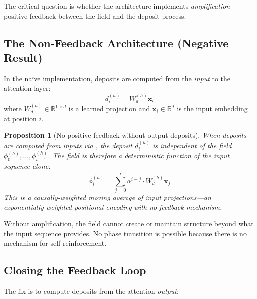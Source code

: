 \documentclass[11pt,a4paper]{article}
\newtheorem{proposition}{Proposition}
\newcommand{\retain}{\alpha}
\newcommand{\R}{\mathbb{R}}
\newcommand{\x}{\bm{x}}
\begin{document}
The critical question is whether the architecture implements
\emph{amplification}---positive feedback between the field and the
deposit process.

\subsection{The Non-Feedback Architecture (Negative Result)}
\label{sec:nonfeedback}

In the na\"ive implementation, deposits are computed from the
\emph{input} to the attention layer:
\begin{equation}
    d_i^{(h)} = W_d^{(h)} \x_i
    \label{eq:deposit_input}
\end{equation}
where $W_d^{(h)} \in \R^{1 \times d}$ is a learned projection and
$\x_i \in \R^d$ is the input embedding at position $i$.

\begin{proposition}[No positive feedback without output deposits]
\label{prop:nofeedback}
When deposits are computed from inputs via ,
the deposit $d_i^{(h)}$ is independent of the field
$\phi_0^{(h)}, \ldots, \phi_{i-1}^{(h)}$. The field is therefore
a deterministic function of the input sequence alone:
\begin{equation}
    \phi_i^{(h)} = \sum_{j=0}^{i} \retain^{i-j} \cdot W_d^{(h)} \x_j
\end{equation}
This is a causally-weighted moving average of input projections---an
exponentially-weighted positional encoding with no feedback mechanism.
\end{proposition}

Without amplification, the field cannot create or maintain
structure beyond what the input sequence provides. No phase
transition is possible because there is no mechanism for
self-reinforcement.

\subsection{Closing the Feedback Loop}
\label{sec:feedback}

The fix is to compute deposits from the attention \emph{output}:
\end{document}
